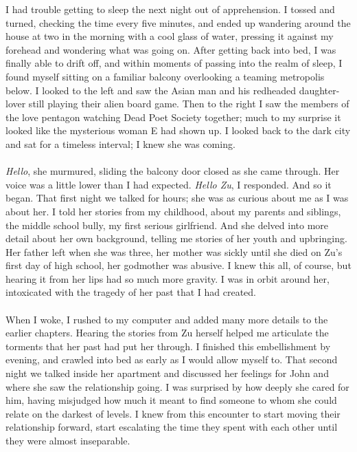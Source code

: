 	I had trouble getting to sleep the next night out of apprehension. I tossed and turned, checking the time every five minutes, and ended up wandering around the house at two in the morning with a cool glass of water, pressing it against my forehead and wondering what was going on. After getting back into bed, I was finally able to drift off, and within moments of passing into the realm of sleep, I found myself sitting on a familiar balcony overlooking a teaming metropolis below. I looked to the left and saw the Asian man and his redheaded daughter-lover still playing their alien board game. Then to the right I saw the members of the love pentagon watching Dead Poet Society together; much to my surprise it looked like the mysterious woman E had shown up. I looked back to the dark city and sat for a timeless interval; I knew she was coming.
\\\\	
	\textit{Hello}, she murmured, sliding the balcony door closed as she came through. Her voice was a little lower than I had expected. \textit{Hello Zu}, I responded. And so it began. That first night we talked for hours; she was as curious about me as I was about her. I told her stories from my childhood, about my parents and siblings, the middle school bully, my first serious girlfriend. And she delved into more detail about her own background, telling me stories of her youth and upbringing. Her father left when she was three, her mother was sickly until she died on Zu’s first day of high school, her godmother was abusive. I knew this all, of course, but hearing it from her lips had so much more gravity. I was in orbit around her, intoxicated with the tragedy of her past that I had created.
\\\\	
	When I woke, I rushed to my computer and added many more details to the earlier chapters. Hearing the stories from Zu herself helped me articulate the torments that her past had put her through. I finished this embellishment by evening, and crawled into bed as early as I would allow myself to. That second night we talked inside her apartment and discussed her feelings for John and where she saw the relationship going. I was surprised by how deeply she cared for him, having misjudged how much it meant to find someone to whom she could relate on the darkest of levels. I knew from this encounter to start moving their relationship forward, start escalating the time they spent with each other until they were almost inseparable.
\\\\	
